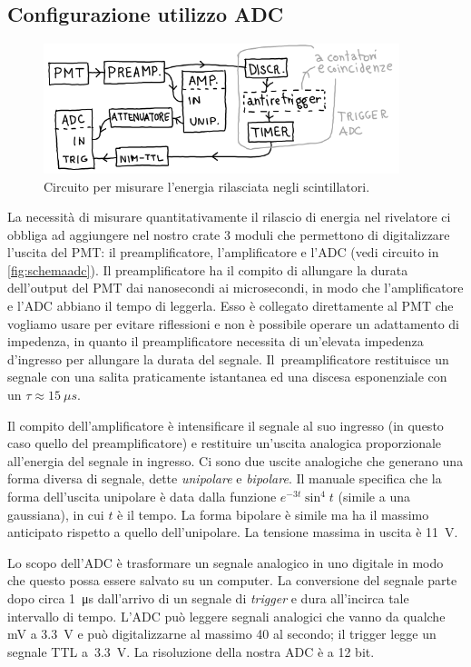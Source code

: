 
\subsection{Configurazione utilizzo ADC}

\begin{figure}
	\centering
	\includegraphics[width=28em]{schemaadc}
	\caption{\label{fig:schemaadc}
	Circuito per misurare l'energia rilasciata negli scintillatori.}
\end{figure}

La necessità di misurare quantitativamente il rilascio di energia nel rivelatore ci obbliga ad aggiungere nel nostro crate 3 moduli che permettono di digitalizzare l'uscita del PMT: il preamplificatore, l'amplificatore e l'ADC
(vedi circuito in \autoref{fig:schemaadc}).
Il preamplificatore ha il compito di allungare la durata dell'output del PMT dai nanosecondi ai microsecondi, in modo che l'amplificatore e l'ADC abbiano il tempo di leggerla. Esso è collegato direttamente al PMT che vogliamo usare per evitare riflessioni e non è possibile operare un adattamento di impedenza, in quanto il preamplificatore necessita di un'elevata impedenza d'ingresso per allungare la durata del segnale. 
Il~preamplificatore restituisce un segnale con una salita praticamente istantanea
ed una discesa esponenziale con un $\tau\approx\SI{15}{\mu s}$.

Il compito dell'amplificatore è intensificare il segnale al suo ingresso
(in questo caso quello del preamplificatore)
e restituire un'uscita analogica proporzionale all'energia del segnale in ingresso.
Ci sono due uscite analogiche che generano una forma diversa di segnale,
dette \emph{unipolare} e \emph{bipolare}.
Il manuale specifica che la forma dell'uscita unipolare
è data dalla funzione $e^{-3t}\sin^4{t}$ (simile a una gaussiana), in cui $t$ è il tempo.
La forma bipolare è simile ma ha il massimo anticipato rispetto a quello dell'unipolare.
La tensione massima in uscita è \SI{11}{V}.

Lo scopo dell'ADC è trasformare un segnale analogico in uno digitale
in modo che questo possa essere salvato su un computer.  
La conversione del segnale parte dopo circa \SI{1}{\micro s} dall'arrivo di un segnale di \emph{trigger} e dura all'incirca tale intervallo di tempo. L'ADC può leggere segnali analogici che vanno da qualche \si{mV} a \SI{3.3}{V} e può digitalizzarne al massimo 40 al secondo;
il trigger legge un segnale TTL a~\SI{3.3}{V}. La risoluzione della nostra ADC è a 12 bit.


